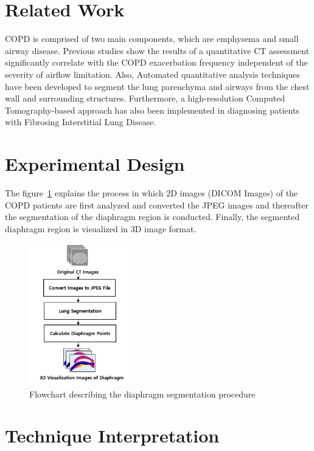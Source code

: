 \documentclass[default]{sn-jnl}
\begin{document}
\section{Related Work}\label{sec:related_work}

COPD is comprised of two main components, which are emphysema and small airway disease. Previous studies show the
results of a quantitative CT assessment significantly correlate with the COPD exacerbation frequency independent of the
severity of airflow limitation. Also, Automated quantitative analysis techniques have been developed to segment the lung
parenchyma and airways from the chest wall and surrounding structures. Furthermore, a high-resolution Computed
Tomography-based approach has also been implemented in diagnosing patients with Fibrosing Interstitial Lung Disease.

\section{Experimental Design}\label{sec:experimental_design}

The figure~\ref{fig:flowchart} explains the process in which 2D images (DICOM Images) of the COPD patients are first analyzed
and converted the JPEG images and thereafter the segmentation of the diaphragm region is conducted. Finally, the
segmented diaphragm region is visualized in 3D image format.

\begin{figure}[htp]
    \centering
    \includegraphics[width=4.4cm]{img/flowchart}
    \caption{Flowchart describing the diaphragm segmentation procedure}
    \captionsetup{justification=centering}
    \label{fig:flowchart}
\end{figure}

\section{Technique Interpretation}\label{sec:technique_interpretation}
\end{document}
